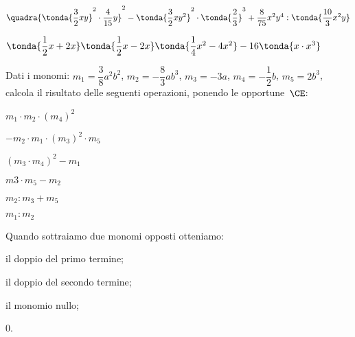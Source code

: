 \begin{esercizio}[*]
\begin{enumeratea}
%  
% 
% 
% 
\item 
\(\quadra{\tonda{\dfrac{3}{2}xy}^{2}\cdot\dfrac{4}{15}y}^{2}-
\tonda{\dfrac{3}{2}xy^{2}}^{2}\cdot\tonda{\dfrac{2}{3}}^{3}%
+\dfrac{8}{75}x^{2}y^{4}:\tonda{\dfrac{10}{3}x^{2}y}\)
\item 
\(\tonda{\dfrac{1}{2}x+2x}\tonda{\dfrac{1}{2}x-2x}
\tonda{\dfrac{1}{4}x^2-4x^{2}} - 16\tonda{x \cdot x^{3}}\)
\end{enumeratea}
\end{esercizio}


\begin{esercizio}
\label{ese:9.37}
Dati i monomi:\quad
\(m_{1}=\dfrac{3}{8}a^{2}b^{2}\),\quad 
\(m_{2}=-{\dfrac{8}{3}}ab^{3}\),\quad 
\(m_{3}=-3a\),\quad 
\(m_{4}=-{\dfrac{1}{2}}b\), \quad \(m_{5}=2b^{3}\),\\
calcola il risultato delle seguenti operazioni, 
ponendo le opportune~\(\CE\):

\vspace{-0.8em}
\begin{htmulticols}{3}
\begin{enumeratea}
\item \(m_{1}\cdot m_{2}\cdot (m_{4})^{2}\)
\item \(-m_{2}\cdot m_{1}\cdot (m_{3})^{2}\cdot m_{5}\)
\item \((m_{3}\cdot m_{4})^{2}-m_{1}\)
\item \(m3\cdot m_{5}-m_{2}\)
\item \(m_{2}:m_{3}+m_{5}\)
\item \(m_{1}:m_{2}\)
\end{enumeratea}
\end{htmulticols}
\end{esercizio}


\begin{esercizio}
\label{ese:9.38}
Quando sottraiamo due monomi opposti otteniamo:

\vspace{-0.8em}
\begin{htmulticols}{2}
\begin{enumeratea}
\item il doppio del primo termine;
\item il doppio del secondo termine;
\item il monomio nullo;
\item 0.
\end{enumeratea}
\end{htmulticols}
\end{esercizio}

